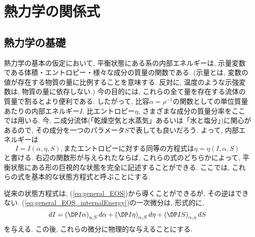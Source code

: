 \section{熱力学の関係式}

\subsection{熱力学の基礎}
熱力学の基本の仮定において, 
平衡状態にある系の内部エネルギーは, 示量変数である体積・エントロピー・様々な成分の質量の関数である. 
(示量とは, 変数の値が存在する物質の量に比例することを意味する. 
反対に, 温度のような示強変数は, 物質の量に依存しない.) 
今の目的には, これらの全て量を存在する流体の質量で割るとより便利である. 
したがって, 比容$\alpha=\rho^{-1}$の関数としての単位質量あたりの内部エネルギー$I$, 
比エントロピー$\eta$, さまざまな成分の質量分率をここでは用いる. 
今, 二成分流体(「乾燥空気と水蒸気」あるいは「水と塩分」)に関心があるので, 
その成分を一つのパラメータ$S$で表しても良いだろう. 
よって, 内部エネルギーは
\begin{subequations} 
\begin{equation}
  I = I(\alpha, \eta, S),  
\label{eq:general_EOS_internalEnergy}
\end{equation}
またエントロピーに対する同等の方程式は
\begin{equation}
  \eta = \eta(I,\alpha,S)
\label{eq:general_EOS_entropy}
\end{equation}
\label{eq:general_EOS}
\end{subequations}
と書ける. 
右辺の関数形が与えられたならば, これらの式のどちらかによって, 
平衡状態にある形の巨視的な状態を完全に記述することができる. 
ここでは, これらの式を基本的な状態方程式と呼ぶことにする. 

従来の状態方程式は, (\ref{eq:general_EOS})から導くことができるが, その逆はできない. 
(\ref{eq:general_EOS_internalEnergy})の一次微分は, 形式的に, 
\begin{equation}
  dI = \DPext{I}{\alpha}{\eta,S} d\alpha + \DPext{I}{\eta}{\alpha,S} d\eta + \DPext{I}{S}{\alpha,\eta} dS 
  \label{eq:internalEnergy_firstDeriv}
\end{equation}
を与える. 
この後, これらの微分に物理的な与えることにする. 


